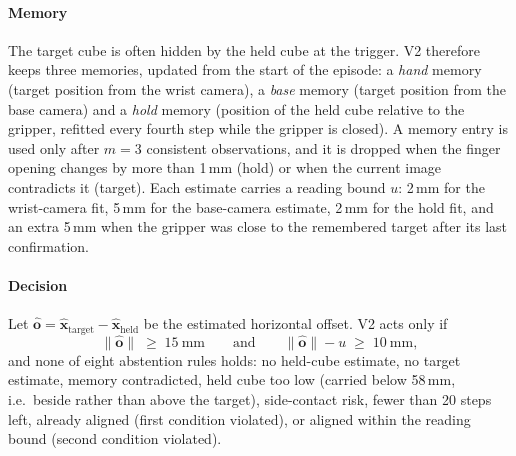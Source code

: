 \paragraph{Memory} The target cube is often hidden by the held cube at the trigger. V2 therefore keeps three memories, updated from the start of the episode: a \emph{hand} memory (target position from the wrist camera), a \emph{base} memory (target position from the base camera) and a \emph{hold} memory (position of the held cube relative to the gripper, refitted every fourth step while the gripper is closed). A memory entry is used only after $m=3$ consistent observations, and it is dropped when the finger opening changes by more than 1\,mm (hold) or when the current image contradicts it (target). Each estimate carries a reading bound $u$: 2\,mm for the wrist-camera fit, 5\,mm for the base-camera estimate, 2\,mm for the hold fit, and an extra 5\,mm when the gripper was close to the remembered target after its last confirmation.

\paragraph{Decision} Let $\hat{\mathbf{o}}=\hat{\mathbf{x}}_{\mathrm{target}}-\hat{\mathbf{x}}_{\mathrm{held}}$ be the estimated horizontal offset. V2 acts only if
\begin{equation}
\|\hat{\mathbf{o}}\| \;\ge\; 15\ \mathrm{mm} \qquad\text{and}\qquad \|\hat{\mathbf{o}}\| - u \;\ge\; 10\ \mathrm{mm},
\end{equation}
and none of eight abstention rules holds: no held-cube estimate, no target estimate, memory contradicted, held cube too low (carried below 58\,mm, i.e.\ beside rather than above the target), side-contact risk, fewer than 20 steps left, already aligned (first condition violated), or aligned within the reading bound (second condition violated).

